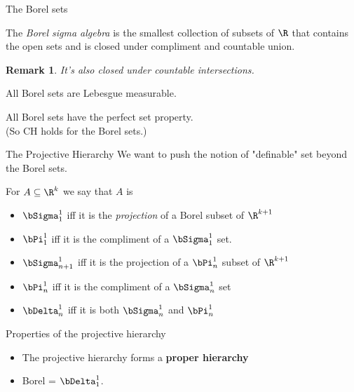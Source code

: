 \documentclass{beamer}
\newtheorem{remark}[theorem]{Remark}
\begin{document}
\begin{frame}{The Borel sets}
\begin{definition}
The \emph{Borel sigma algebra} is the smallest collection of subsets
of $\R$ that contains the open sets and is closed under compliment
and countable union.
\end{definition}

\begin{remark}
It's also closed under countable intersections.
\end{remark}

\begin{fact}
All Borel sets are Lebesgue measurable.
\end{fact}

\begin{theorem}
All Borel sets have the perfect set property. \\
(So CH holds for the Borel sets.)
\end{theorem}

\end{frame}

\begin{frame}{The Projective Hierarchy}
We want to push the notion of "definable" set beyond the Borel sets.

\pause

For $A\subseteq \R^{k}$ we say that $A$ is

\begin{itemize}
\item  $\bSigma^1_1$ iff it is the \emph{projection} of a Borel subset of $\R^{k+1}$
\item  $\bPi^1_1$ iff it is the compliment of a $\bSigma^1_1$ set.
\item $\bSigma^1_{n+1}$ iff it is the projection of a $\bPi^1_n$ subset of $\R^{k+1}$
\item $\bPi^1_{n}$ iff it is the compliment of a
      $\bSigma^1_{n}$ set
\item $\bDelta^1_{n}$ iff it is both
      $\bSigma^1_{n}$ and $\bPi^1_{n}$
\end{itemize}

\end{frame}

\begin{frame}{Properties of the projective hierarchy}

\begin{fact}
\begin{itemize}
\item  The projective hierarchy forms a \textbf{proper hierarchy}
\item Borel = $\bDelta^1_1$.
\end{itemize}
\end{fact}

\end{frame}
\end{document}
